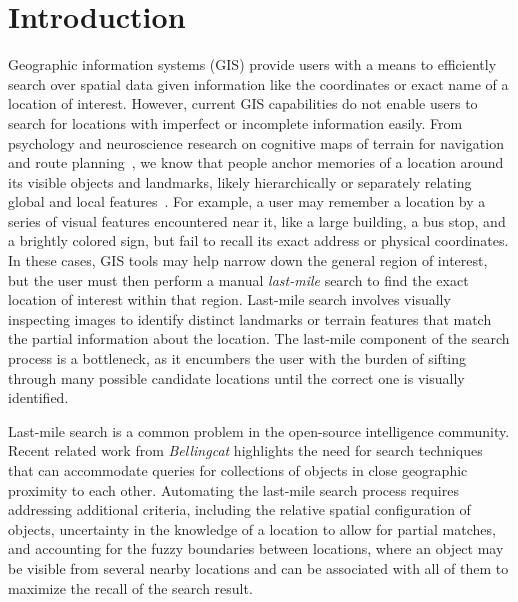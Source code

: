 \section{Introduction}
\label{section:introduction}
Geographic information systems (GIS) provide users with a means to efficiently search over spatial data given information like the coordinates or exact name of a location of interest. 
However, current GIS capabilities do not enable users to search for locations with imperfect or incomplete information easily. 
From psychology and neuroscience research on cognitive maps of terrain for navigation and route planning~\cite{Weisberg2016, Miller2013, Keatley2021}, we know that people anchor memories of a location around its visible objects and landmarks, likely hierarchically or separately relating global and local features~\cite{Weisberg2016}. 
For example, a user may remember a location by a series of visual features encountered near it, like a large building, a bus stop, and a brightly colored sign, but fail to recall its exact address or physical coordinates. 
In these cases, GIS tools may help narrow down the general region of interest, but the user must then perform a manual \emph{last-mile} search to find the exact location of interest within that region. 
Last-mile search involves visually inspecting images to identify distinct landmarks or terrain features that match the partial information about the location. 
The last-mile component of the search process is a bottleneck, as it encumbers the user with the burden of sifting through many possible candidate locations until the correct one is visually identified. 

Last-mile search is a common problem in the open-source intelligence community. Recent related work from \textit{Bellingcat}
highlights the need for search techniques that can accommodate queries for collections of objects in close geographic proximity to each other.
Automating the last-mile search process requires addressing additional criteria, including the relative spatial configuration of objects, uncertainty in the knowledge of a location to allow for partial matches, and accounting for the fuzzy boundaries between locations, where an object may be visible from several nearby locations and can be associated with all of them to maximize the recall of the search result.

